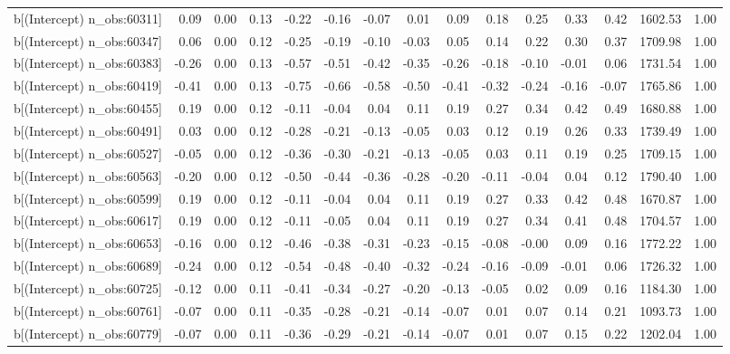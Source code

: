 \begin{table}[ht]
\begin{tabular}{rrrrrrrrrrrrrrr}
  b[(Intercept) n\_obs:60311] & 0.09 & 0.00 & 0.13 & -0.22 & -0.16 & -0.07 & 0.01 & 0.09 & 0.18 & 0.25 & 0.33 & 0.42 & 1602.53 & 1.00 \\ 
  b[(Intercept) n\_obs:60347] & 0.06 & 0.00 & 0.12 & -0.25 & -0.19 & -0.10 & -0.03 & 0.05 & 0.14 & 0.22 & 0.30 & 0.37 & 1709.98 & 1.00 \\ 
  b[(Intercept) n\_obs:60383] & -0.26 & 0.00 & 0.13 & -0.57 & -0.51 & -0.42 & -0.35 & -0.26 & -0.18 & -0.10 & -0.01 & 0.06 & 1731.54 & 1.00 \\ 
  b[(Intercept) n\_obs:60419] & -0.41 & 0.00 & 0.13 & -0.75 & -0.66 & -0.58 & -0.50 & -0.41 & -0.32 & -0.24 & -0.16 & -0.07 & 1765.86 & 1.00 \\ 
  b[(Intercept) n\_obs:60455] & 0.19 & 0.00 & 0.12 & -0.11 & -0.04 & 0.04 & 0.11 & 0.19 & 0.27 & 0.34 & 0.42 & 0.49 & 1680.88 & 1.00 \\ 
  b[(Intercept) n\_obs:60491] & 0.03 & 0.00 & 0.12 & -0.28 & -0.21 & -0.13 & -0.05 & 0.03 & 0.12 & 0.19 & 0.26 & 0.33 & 1739.49 & 1.00 \\ 
  b[(Intercept) n\_obs:60527] & -0.05 & 0.00 & 0.12 & -0.36 & -0.30 & -0.21 & -0.13 & -0.05 & 0.03 & 0.11 & 0.19 & 0.25 & 1709.15 & 1.00 \\ 
  b[(Intercept) n\_obs:60563] & -0.20 & 0.00 & 0.12 & -0.50 & -0.44 & -0.36 & -0.28 & -0.20 & -0.11 & -0.04 & 0.04 & 0.12 & 1790.40 & 1.00 \\ 
  b[(Intercept) n\_obs:60599] & 0.19 & 0.00 & 0.12 & -0.11 & -0.04 & 0.04 & 0.11 & 0.19 & 0.27 & 0.33 & 0.42 & 0.48 & 1670.87 & 1.00 \\ 
  b[(Intercept) n\_obs:60617] & 0.19 & 0.00 & 0.12 & -0.11 & -0.05 & 0.04 & 0.11 & 0.19 & 0.27 & 0.34 & 0.41 & 0.48 & 1704.57 & 1.00 \\ 
  b[(Intercept) n\_obs:60653] & -0.16 & 0.00 & 0.12 & -0.46 & -0.38 & -0.31 & -0.23 & -0.15 & -0.08 & -0.00 & 0.09 & 0.16 & 1772.22 & 1.00 \\ 
  b[(Intercept) n\_obs:60689] & -0.24 & 0.00 & 0.12 & -0.54 & -0.48 & -0.40 & -0.32 & -0.24 & -0.16 & -0.09 & -0.01 & 0.06 & 1726.32 & 1.00 \\ 
  b[(Intercept) n\_obs:60725] & -0.12 & 0.00 & 0.11 & -0.41 & -0.34 & -0.27 & -0.20 & -0.13 & -0.05 & 0.02 & 0.09 & 0.16 & 1184.30 & 1.00 \\ 
  b[(Intercept) n\_obs:60761] & -0.07 & 0.00 & 0.11 & -0.35 & -0.28 & -0.21 & -0.14 & -0.07 & 0.01 & 0.07 & 0.14 & 0.21 & 1093.73 & 1.00 \\ 
  b[(Intercept) n\_obs:60779] & -0.07 & 0.00 & 0.11 & -0.36 & -0.29 & -0.21 & -0.14 & -0.07 & 0.01 & 0.07 & 0.15 & 0.22 & 1202.04 & 1.00 \\ 

\end{tabular}
\end{table}
